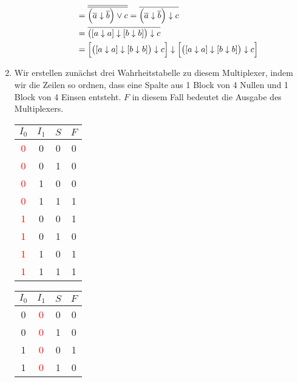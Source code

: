 \begin{enumerate}[label={Aufgabe Ü\arabic*},start=4]
\begin{enumerate}[label={\alph*.}]
\begin{align*}
    				&= \overline{\overline{\left(\overline{a} \downarrow \overline{b}\right) \lor c}} = \overline{\left(\overline{a} \downarrow \overline{b}\right) \downarrow c}\\
    				&= \overline{\left(\left[a \downarrow a\right] \downarrow \left[b \downarrow b\right]\right) \downarrow c} \\
    				&= \left[\left(\left[a \downarrow a\right] \downarrow \left[b \downarrow b\right]\right) \downarrow c\right] \downarrow \left[\left(\left[a \downarrow a\right] \downarrow \left[b \downarrow b\right]\right) \downarrow c\right]
    			\end{align*}
    	\end{enumerate}
    \item \label{auf:mux}
    	Wir erstellen zunächst drei Wahrheitstabelle zu diesem Multiplexer, indem wir die Zeilen so ordnen, dass eine Spalte aus 1 Block von 4 Nullen und 1 Block von 4 Einsen entsteht. $F$ in diesem Fall bedeutet die Ausgabe des Multiplexers.
    	\begin{multicols}{3}
	    	\begin{center}
	    		\ttfamily
	    		\begin{tabular}{ccc|c}
	    			\toprule
	    			$I_0$ & $I_1$ & $S$ & $F$ \\
	    			\midrule
	    			\textcolor{red}{0} & 0 & 0 & 0 \\
					\textcolor{red}{0} & 0 & 1 & 0 \\
					\textcolor{red}{0} & 1 & 0 & 0 \\
					\textcolor{red}{0} & 1 & 1 & 1 \\
					\rowcolor{SpringGreen} \textcolor{red}{1} & 0 & 0 & 1 \\
					\rowcolor{SpringGreen} \textcolor{red}{1} & 0 & 1 & 0 \\
					\textcolor{red}{1} & 1 & 0 & 1 \\
					\textcolor{red}{1} & 1 & 1 & 1 \\
	    			\bottomrule
	    		\end{tabular}
			\end{center}
			\begin{center}
	    		\ttfamily
	    		\begin{tabular}{ccc|c}
	    			\toprule
	    			$I_0$ & $I_1$ & $S$ & $F$ \\
	    			\midrule
	    			0 & \textcolor{red}{0} & 0 & 0 \\
					0 & \textcolor{red}{0} & 1 & 0 \\
					1 & \textcolor{red}{0} & 0 & 1 \\
					1 & \textcolor{red}{0} & 1 & 0 \\

\end{tabular}
\end{center}
\end{multicols}
\end{enumerate}

